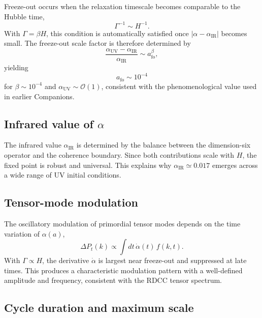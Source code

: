 \documentclass[11pt,a4paper]{article}
\begin{document}
Freeze-out occurs when the relaxation timescale becomes comparable to the Hubble
time,
\begin{equation}
    \Gamma^{-1} \sim H^{-1}.
\end{equation}
With $\Gamma = \beta H$, this condition is automatically satisfied once
$|\alpha - \alpha_{\mathrm{IR}}|$ becomes small. The freeze-out scale factor is therefore
determined by
\begin{equation}
    \frac{\alpha_{\mathrm{UV}} - \alpha_{\mathrm{IR}}}{\alpha_{\mathrm{IR}}}
    \sim a_{\mathrm{fo}}^{\beta},
\end{equation}
yielding
\begin{equation}
    a_{\mathrm{fo}} \sim 10^{-4}
\end{equation}
for $\beta \sim 10^{-4}$ and $\alpha_{\mathrm{UV}} \sim \mathcal{O}(1)$, consistent with the
phenomenological value used in earlier Companions.

\subsection{Infrared value of \texorpdfstring{$\alpha$}{α}}

The infrared value $\alpha_{\mathrm{IR}}$ is determined by the balance between the
dimension-six operator and the coherence boundary. Since both contributions scale with
$H$, the fixed point is robust and universal. This explains why
$\alpha_{\mathrm{IR}} \simeq 0.017$ emerges across a wide range of UV initial conditions.

\subsection{Tensor-mode modulation}

The oscillatory modulation of primordial tensor modes depends on the time variation of
$\alpha(a)$,
\begin{equation}
    \Delta P_{t}(k)
    \propto \int dt\, \dot{\alpha}(t)\, f(k,t).
\end{equation}
With $\Gamma \propto H$, the derivative $\dot{\alpha}$ is largest near freeze-out and
suppressed at late times. This produces a characteristic modulation pattern with a
well-defined amplitude and frequency, consistent with the RDCC tensor spectrum.

\subsection{Cycle duration and maximum scale}
\end{document}
